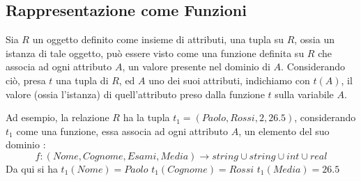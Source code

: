 \documentclass[12pt, letterpaper]{article}
\begin{document}
\subsection{Rappresentazione come Funzioni}
Sia \(R\) un oggetto definito come insieme di attributi, una tupla su \(R\), ossia un istanza di
tale oggetto, può essere visto come una funzione definita su \(R\) che associa ad ogni attributo \(A\), un valore
presente nel dominio di \(A\). Considerando ciò, presa \(t\) una tupla di \(R\), ed \(A\) uno dei suoi attributi,
indichiamo con \(t(A)\), il valore (ossia l'istanza) di quell'attributo preso dalla funzione \(t\) sulla variabile \(A\).

Ad esempio, la relazione \(R\) ha la tupla \(t_1=(Paolo,Rossi,2,26.5)\), considerando \(t_1\) come una funzione,
essa associa ad ogni attributo \(A\), un elemento del suo dominio :
\begin{equation}
    f : (Nome,Cognome,Esami,Media)\rightarrow string\cup string\cup int \cup real
\end{equation}
Da qui si ha \hphantom{aa} \(t_1(Nome)=Paolo\)\hphantom{aa}  \(t_1(Cognome)=Rossi\)\hphantom{aa} \(t_1(Media)=26.5\)\\
\end{document}
